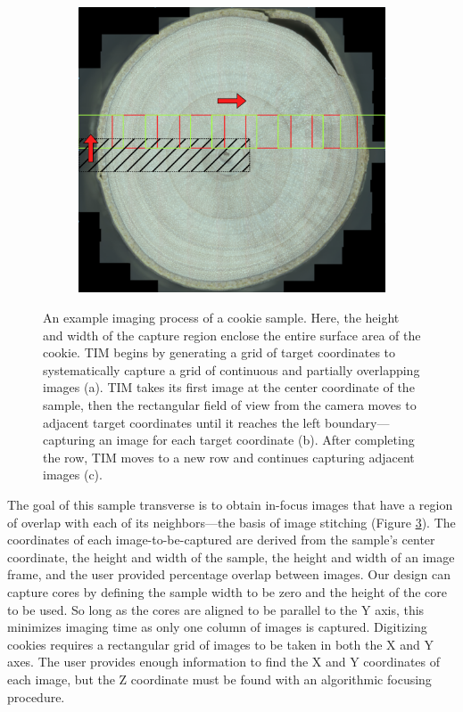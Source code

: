 \documentclass[a4paper,12pt]{article}
\begin{document}
\begin{figure}
\begin{subfigure}{.3\textwidth}
      \caption{}
      \label{SUBFIGURE LABEL 2}
  \end{subfigure}
  \begin{subfigure}{.3\textwidth}
      \centering
      \includegraphics[width=.95\linewidth]{../content/cookie_figure_second_row.png}  
      \caption{}
      \label{SUBFIGURE LABEL 3}
  \end{subfigure} 
  \caption{An example imaging process of a cookie sample. Here, the height and width of the capture region enclose the entire surface area of the cookie.  TIM begins by generating a grid of target coordinates to systematically capture a grid of continuous and partially overlapping images (a). TIM takes its first image at the center coordinate of the sample, then the rectangular field of view from the camera moves to adjacent target coordinates until it reaches the left boundary---capturing an image for each target coordinate (b). After completing the row, TIM moves to a new row and continues capturing adjacent images (c). }
  \label{FIGURE LABEL}
  \end{figure}

The goal of this sample transverse is to obtain in-focus images that have a region of overlap with each of its neighbors---the basis of image stitching (Figure \ref{FIGURE LABEL}). 
The coordinates of each image-to-be-captured are derived from the sample's center coordinate, the height and width of the sample, the height and width of an image frame, and the user provided percentage overlap between images.  
Our design can capture cores by defining the sample width to be zero and the height of the core to be used. So long as the cores are aligned to be parallel to the Y axis, this minimizes imaging time as only one column of images is captured.
Digitizing cookies requires a rectangular grid of images to be taken in both the X and Y axes. 
The user provides enough information to find the X and Y coordinates of each image, but the Z coordinate must be found with an algorithmic focusing procedure. 
\end{document}
